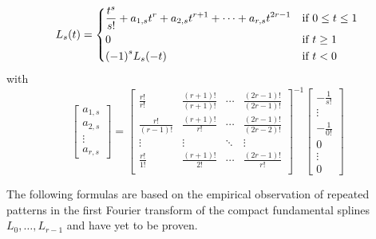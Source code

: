 \begin{equation}
  L_s(t) = \begin{dcases}
    \frac{t^{s}}{s!} + a_{1,s}t^{r} + a_{2,s}t^{r+1} + \cdots + a_{r,s} t^{2r-1} & \text{if} \ 0 \leq t \leq 1 \\
    0 & \text{if} \ t \geq 1 \\
    {(-1)}^s L_s(-t)  & \text{if} \ t < 0
  \end{dcases}
\end{equation}
with
\begin{equation}
  \begin{bmatrix}
    a_{1,s} \\ a_{2,s} \\ \vdots \\ a_{r,s} 
  \end{bmatrix}
  =
  {\begin{bmatrix}
    \frac{r!}{r!} & \frac{(r+1)!}{(r+1)!} & \cdots & \frac{(2r-1)!}{(2r-1)!}  \\
    \frac{r!}{(r-1)!} & \frac{(r+1)!}{r!} & \cdots & \frac{(2r-1)!}{(2r-2)!}  \\
    \vdots & \vdots & \ddots & \vdots \\
    \frac{r!}{1!} & \frac{(r+1)!}{2!} & \cdots & \frac{(2r-1)!}{r!}  \\
  \end{bmatrix}}^{-1}
  \begin{bmatrix} -\frac{1}{s!} \\ \vdots \\ -\frac{1}{0!} \\ 0 \\ \vdots \\ 0 \end{bmatrix}
\end{equation}

The following formulas are based on the empirical observation of repeated patterns in the first Fourier transform of the 
compact fundamental splines $L_0, \ldots, L_{r-1}$ and have yet to be proven. 

